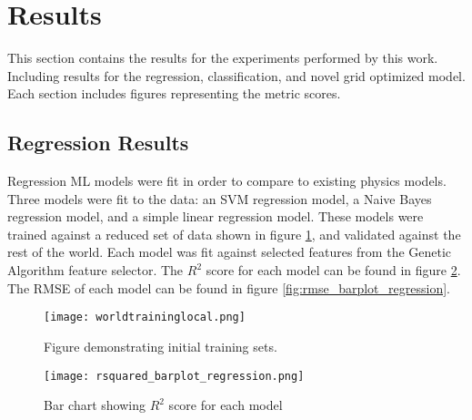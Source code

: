 \section{Results}
\setlength{\parindent}{10ex}

This section contains the results for the experiments performed by this work.
Including results for the regression, classification, and novel grid optimized model.
Each section includes figures representing the metric scores.

\subsection{Regression Results}
Regression \ac{ML} models were fit in order to compare to existing physics models.
Three models were fit to the data: 
an SVM regression model, a Naive Bayes regression model, and a simple linear regression model.
These models were trained against a reduced set of data shown in figure \ref{fig:trainset}, and validated against the rest of the world.
Each model was fit against selected features from the Genetic Algorithm feature selector.
The \(R^2\) score for each model can be found in figure \ref{fig:r2_barplot_regression}.
The RMSE of each model can be found in figure \ref{fig:rmse_barplot_regression}.



\begin{figure}[h]
    \centering
    \texttt{[image: worldtraininglocal.png]}
    \caption{Figure demonstrating initial training sets.}
    \label{fig:trainset}
\end{figure}


\begin{figure}[h]
    \centering
    \texttt{[image: rsquared\_barplot\_regression.png]}
    \caption{Bar chart showing \(R^2\) score for each model}
    \label{fig:r2_barplot_regression}
\end{figure}

